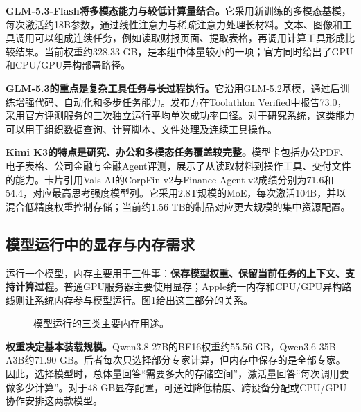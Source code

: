 \textbf{GLM-5.3-Flash将多模态能力与较低计算量结合。}它采用新训练的多模态基模，每次激活约18B参数，通过线性注意力与稀疏注意力处理长材料。文本、图像和工具调用可以组成连续任务，例如读取财报页面、提取表格，再调用计算工具形成比较结果。当前权重约328.33 GB，是本组中体量较小的一项；官方同时给出了GPU和CPU/GPU异构部署路径。

\textbf{GLM-5.3的重点是复杂工具任务与长过程执行。}它沿用GLM-5.2基模，通过后训练增强代码、自动化和多步任务能力。发布方在Toolathlon Verified中报告73.0，采用官方评测服务的三次独立运行平均单次成功率口径。对于研究系统，这类能力可以用于组织数据查询、计算脚本、文件处理及连续工具操作。

\textbf{Kimi K3的特点是研究、办公和多模态任务覆盖较完整。}模型卡包括办公PDF、电子表格、公司金融与金融Agent评测，展示了从读取材料到操作工具、交付文件的能力。卡片引用Vals AI的CorpFin v2与Finance Agent v2成绩分别为71.6和54.4，对应最高思考强度模型列。它采用2.8T规模的MoE，每次激活104B，并以混合低精度权重控制存储；当前约1.56 TB的制品对应更大规模的集中资源配置。

\subsection{模型运行中的显存与内存需求}\label{sec:memory}
运行一个模型，内存主要用于三件事：\textbf{保存模型权重、保留当前任务的上下文、支持计算过程}。普通GPU服务器主要使用显存；Apple统一内存和CPU/GPU异构路线则让系统内存参与模型运行。图\ref{fig:memory}给出这三部分的关系。

\begin{figure}[H]\centering
{}
\caption{模型运行的三类主要内存用途。}\label{fig:memory}
\end{figure}

\textbf{权重决定基本装载规模。}Qwen3.8-27B的BF16权重约55.56 GB，Qwen3.6-35B-A3B约71.90 GB。后者每次只选择部分专家计算，但内存中保存的是全部专家。因此，选择模型时，总体量回答“需要多大的存储空间”，激活量回答“每次调用要做多少计算”。对于48 GB显存配置，可通过降低精度、跨设备分配或CPU/GPU协作安排这两款模型。

